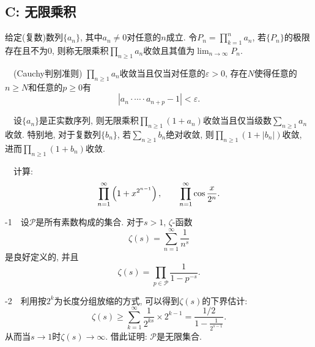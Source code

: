\subsection*{C: 无限乘积}

给定(复数)数列$\{ a_n \}$, 其中$a_n \neq 0$对任意的$n$成立. 令$P_n = \prod_{k=1}^{n} a_n$, 若$\{ P_n \}$的极限存在且不为$0$, 则称无限乘积$\prod_{n \geq 1}a_n$收敛且其值为$\lim_{n \to \infty} P_n$. 
\vspace{1em}

~~(Cauchy判别准则) $\prod_{n \geq 1}a_n$收敛当且仅当对任意的$\varepsilon >0$, 存在$N$使得任意的$n \geq N$和任意的$p \geq 0$有$$|a_n \cdot \cdots \cdot a_{n+p}-1|<\varepsilon .$$

~~设$\{ a_n \}$是正实数序列, 则无限乘积$\prod_{n \geq 1} (1+a_n)$收敛当且仅当级数$\sum_{n\geq 1}a_n$收敛. 特别地, 对于复数列$\{ b_n \}$, 若$\sum_{n\geq 1}b_n$绝对收敛, 则$\prod_{n \geq 1} (1+|b_n|)$收敛, 进而$\prod_{n \geq 1} (1+b_n)$收敛. 
\vspace{1em}

~~计算: $$\prod_{n=1}^{\infty} \left( 1+x^{2^{n-1}} \right),\qquad \prod_{n=1}^{\infty} \cos \frac{x}{2^n}.$$

-1~~设$\mathcal{P}$是所有素数构成的集合. 对于$s>1$, $\zeta$-函数$$\zeta (s) = \sum_{n=1}^{\infty} \frac{1}{n^s}$$
是良好定义的, 并且$$\zeta (s) = \prod_{p \in \mathcal{P}} \frac{1}{1-p^{-s}}. $$

-2~~利用按$2^k$为长度分组放缩的方式, 可以得到$\zeta (s)$的下界估计: $$\zeta (s) \geq \sum_{k=1}^{\infty} \frac{1}{2^{ks}} \times 2^{k-1} = \frac{1/2}{1-\frac{1}{2^{s-1}}}.$$
从而当$s \to 1$时$\zeta (s) \to \infty$. 借此证明: $\mathcal{P}$是无限集合. 


















